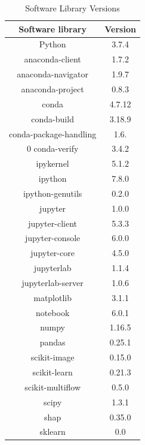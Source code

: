 \documentclass[conference]{IEEEtran}
\begin{document}
\begin{table}[htbp]
\caption{Software Library Versions}
\begin{center}
\begin{tabular}{|c|c|}
	\hline
	\textbf{Software library} & \textbf{Version} \\
	\hline
	Python & 3.7.4\\ \hline
	anaconda-client & 1.7.2 \\ \hline
	anaconda-navigator & 1.9.7 \\ \hline
	anaconda-project & 0.8.3\\ \hline
	conda & 4.7.12\\ \hline
	conda-build & 3.18.9\\ \hline
	conda-package-handling & 1.6.\\ \hline0
	conda-verify & 3.4.2\\ \hline
	ipykernel & 5.1.2\\ \hline
	ipython & 7.8.0\\ \hline
	ipython-genutils & 0.2.0\\ \hline
	jupyter & 1.0.0\\ \hline
	jupyter-client & 5.3.3\\ \hline
	jupyter-console & 6.0.0\\ \hline
	jupyter-core & 4.5.0\\ \hline
	jupyterlab & 1.1.4\\ \hline
	jupyterlab-server & 1.0.6\\ \hline
	matplotlib & 3.1.1\\ \hline
	notebook & 6.0.1\\ \hline
	numpy & 1.16.5\\ \hline
	pandas & 0.25.1\\ \hline
	scikit-image & 0.15.0\\ \hline
	scikit-learn & 0.21.3\\ \hline
	scikit-multiflow & 0.5.0\\ \hline                 
	scipy & 1.3.1\\ \hline
	shap & 0.35.0\\ \hline
	sklearn & 0.0\\ \hline
	
\end{tabular}
\label{softwareVersion}
\end{center}
\end{table}
\end{document}
